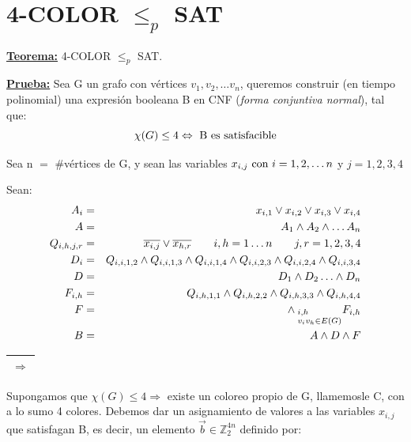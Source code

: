 \documentclass[12pt,a4paper]{report}
\begin{document}
	\section{4-COLOR $\leq_{\textit{p}}$ SAT}
		\textbf{\underline{Teorema:}} 4-COLOR $\leq_{p}$ SAT.

		\textbf{\underline{Prueba:}} Sea G un grafo con vértices $v_{1}, v_{2}, \dotsc v_{n}$, queremos construir (en tiempo polinomial) una expresión booleana B en CNF (\textit{forma conjuntiva normal}), tal que:
			\[ \chi(G) \leq 4 \Leftrightarrow \textup{ B es satisfacible} \]
			\par Sea n $=$ \#vértices de G, y sean las variables $x_{i, j} \textup{ con } i = 1, 2, \dotsc n$ y $j = 1, 2, 3, 4$

			\vspace{3mm}
			\par Sean:
			\begin{eqnarray}
				\nonumber A_{i} &=& x_{i, 1} \vee x_{i, 2} \vee x_{i, 3} \vee x_{i, 4}  \\
				\nonumber A &=& A_{1} \wedge A_{2} \wedge \dotsc A_{n} \\
				\nonumber Q_{i, h, j, r} &=& \overline{x_{i, j}} \vee \overline{x_{h, r}}  \qquad i, h = 1 \dotsc n \qquad j, r = 1, 2, 3, 4 \\
				\nonumber D_{i} &=& Q_{i, i, 1, 2} \wedge Q_{i, i, 1, 3} \wedge Q_{i, i, 1, 4} \wedge Q_{i, i, 2, 3} \wedge Q_{i, i, 2, 4} \wedge Q_{i, i, 3, 4} \\
				\nonumber D &=& D_{1} \wedge D_{2} \dotsc \wedge D_{n} \\
				\nonumber F_{i, h} &=& Q_{i, h, 1, 1} \wedge Q_{i, h, 2, 2} \wedge Q_{i, h, 3, 3} \wedge Q_{i, h, 4, 4} \\
				\nonumber F &=& \wedge_{\begin{subarray}{l} \; i, h \\ \; v_{i} v_{h} \in E(G) \end{subarray}} F_{i, h} \\
				\nonumber B &=& A \wedge D \wedge F
			\end{eqnarray}

			\vspace{5mm}
			\begin{tabular}{|c|} \hline $\Rightarrow$ \\ \hline \end{tabular} Supongamos que $\chi(G) \leq 4 \Rightarrow$ existe un coloreo propio de G, llamemosle C, con a lo sumo 4 colores. Debemos dar un asignamiento de valores a las variables $x_{i, j}$ que satisfagan B, es decir, un elemento $\overrightarrow{b} \in \mathbb{Z}^{4n}_{2}$ definido por:
\end{document}
